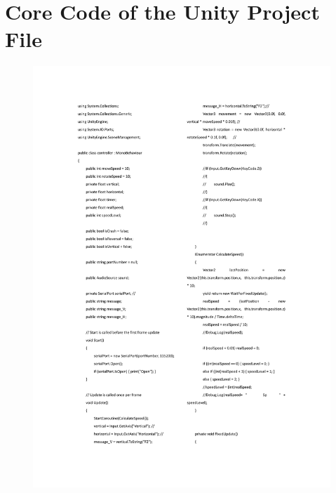 \section{Core Code of the Unity Project File}
\begin{figure}[h]
\centering
\includegraphics[width=1\textwidth,height=0.7\textheight]{A_thesis/appendix/code_unity-1.png}
\end{figure}
\newpage

